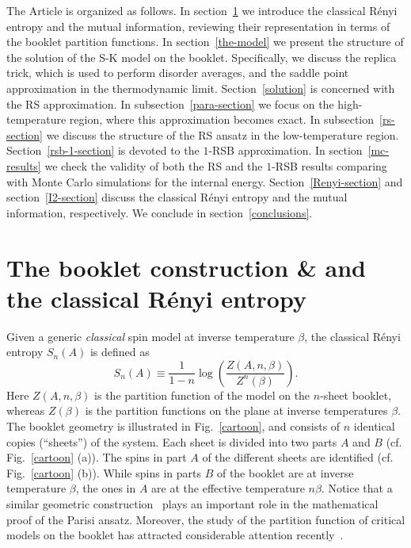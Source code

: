\documentclass[twocolumn,superscriptaddress,prb,10pt]{revtex4-1}
\begin{document}
The Article is organized as follows. In section~\ref{booklet} we introduce the classical 
R\'enyi entropy and the mutual information, reviewing their representation in terms of 
the booklet partition functions. In section~\ref{the-model} we present the structure of 
the solution of the S-K model on the booklet. Specifically, we discuss the replica 
trick, which is used to perform disorder averages, and the saddle point approximation in 
the thermodynamic limit. Section~\ref{solution} is concerned with the RS approximation. 
In subsection~\ref{para-section} we focus on the high-temperature region, where this 
approximation becomes exact. In subsection~\ref{rs-section} we discuss the structure of 
the RS ansatz in the low-temperature region. Section~\ref{rsb-1-section} is devoted to 
the $1$-RSB approximation. In section~\ref{mc-results} we check the validity of both the 
RS and the $1$-RSB results comparing with Monte Carlo simulations for the internal energy. 
Section~\ref{Renyi-section} and section~\ref{I2-section} discuss the classical R\'enyi 
entropy and the mutual information, respectively. We conclude in section~\ref{conclusions}.



\section{The booklet construction \& and the classical R\'enyi entropy}
\label{booklet}

Given a generic \emph{classical} spin model at inverse temperature $\beta$, 
the classical R\'enyi entropy $S_n(A)$ is defined as~\cite{jaconis-2013,stephan-2014} 
%
\begin{equation}
\label{renyi}
S_n(A)\equiv \frac{1}{1-n}\log\left(\frac{Z(A,n,\beta)}{Z^n(\beta)}\right).
\end{equation}
%
Here $Z(A,n,\beta)$ is the partition function of the model on the $n$-sheet booklet, 
whereas $Z(\beta)$ is the partition functions on the plane at inverse temperatures 
$\beta$. The booklet geometry is illustrated in Fig.~\ref{cartoon}, and consists of 
$n$ identical copies (``sheets'') of the system. Each sheet is divided into two 
parts $A$ and $B$ (cf. Fig.~\ref{cartoon} (a)). The spins in part $A$ of the different 
sheets are identified (cf. Fig.~\ref{cartoon} (b)). While spins in parts $B$ of the booklet 
are at inverse temperature $\beta$, the ones in $A$ are at the effective temperature $n\beta$. 
Notice that a similar geometric construction~\cite{guerra-2002} plays an important role in the 
mathematical proof of the Parisi ansatz. Moreover, the study of the partition function of 
critical models on the booklet has attracted considerable attention recently~\cite{fradkin-2006,
fradkin-2009,hsu-2009,stephan-2009,hsu-2010,oshikawa-2010,stephan-2010,zaletel-2011}.
\end{document}
